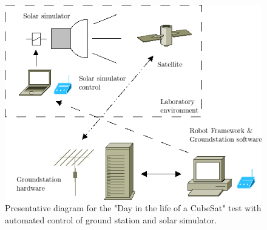 \documentclass[english,12pt,a4paper,pdftex,elec,utf8]{aaltothesis}
\begin{document}
\begin{figure}[h!]
\centering
\includegraphics[scale=0.6]{dayinlifesetupdiagram}
\caption{Presentative diagram for the "Day in the life of a CubeSat" test with automated control of ground station and solar simulator.}
\label{dayinlifediagram}
\end{figure}   
  
\end{document}
